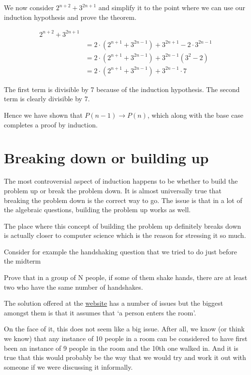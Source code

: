 \documentclass[12pt]{article}
\begin{document}
We now consider $2^{n+2} +3^{2n+1}$ and simplify it to the point where we can use our induction hypothesis and prove the theorem.

\begin{align*}
2^{n+2} + 3^{2n+1} \\
&= 2\cdot(2^{n+1} + 3^{2n-1}) + 3^{2n+1} - 2\cdot 3^{2n-1} \\
&= 2\cdot(2^{n+1} + 3^{2n-1}) + 3^{2n-1}(3^2 - 2) \\
&= 2\cdot(2^{n+1} + 3^{2n-1}) + 3^{2n-1}\cdot 7 
\end{align*}

The first term is divisible by 7 because of the induction hypothesis. The second term is clearly divisible by 7.

Hence we have shown that $P(n-1) \rightarrow P(n)$, which along with the base case completes a proof by induction.

\section*{Breaking down or building up}

The most controversial aspect of induction happens to be whether to build the problem up or break the problem down. It is almost universally true that breaking the problem down is the correct way to go. The issue is that in a lot of the algebraic questions, building the problem up works as well. 

The place where this concept of building the problem up definitely breaks down is actually closer to computer science which is the reason for stressing it so much.

Consider for example the handshaking question that we tried to do just before the midterm

\begin{Exercise*}
Prove that in a group of N people,
if some of them shake hands,
there are at least two who have the same number of handshakes. 
\end{Exercise*}

The solution offered at the \href{http://www.gottfriedville.net/mathprob/comb-shakes.html}{website} has a number of issues but the biggest amongst them is that it assumes that `a person enters the room'. 

On the face of it, this does not seem like a big issue. After all, we know (or think we know) that any instance of 10 people in a room can be considered to have first been an instance of 9 people in the room and the 10th one walked in. And it is true that this would probably be the way that we would try and work it out with someone if we were discussing it informally.
\end{document}
